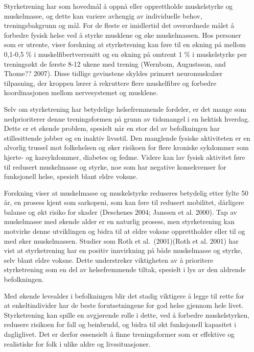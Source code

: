 \documentclass[
  letterpaper,
  DIV=11,
  numbers=noendperiod]{scrreprt}
\begin{document}
Styrketrening har som hovedmål å oppnå eller opprettholde muskelstyrke
og muskelmasse, og dette kan variere avhengig av individuelle behov,
treningsbakgrunn og mål. For de fleste er imidlertid det overordnede
målet å forbedre fysisk helse ved å styrke musklene og øke muskelmassen.
Hos personer som er utrente, viser forskning at styrketrening kan føre
til en økning på mellom 0,1-0,5 \% i muskelfibertverrsnitt og en økning
på omtrent 1 \% i muskelstyrke per treningsøkt de første 8-12 ukene med
trening (Wernbom, Augustsson, and Thome?? 2007). Disse tidlige
gevinstene skyldes primært neuromuskulær tilpasning, der kroppen lærer å
rekruttere flere muskelfibre og forbedre koordinasjonen mellom
nervesystemet og musklene.

Selv om styrketrening har betydelige helsefremmende fordeler, er det
mange som nedprioriterer denne treningsformen på grunn av tidsmangel i
en hektisk hverdag. Dette er et økende problem, spesielt når en stor del
av befolkningen har stillesittende jobber og en inaktiv livsstil. Den
manglende fysiske aktiviteten er en alvorlig trussel mot folkehelsen og
øker risikoen for flere kroniske sykdommer som hjerte- og karsykdommer,
diabetes og fedme. Videre kan lav fysisk aktivitet føre til redusert
muskelmasse og styrke, noe som har negative konsekvenser for funksjonell
helse, spesielt blant eldre voksne.

Forskning viser at muskelmasse og muskelstyrke reduseres betydelig etter
fylte 50 år, en prosess kjent som sarkopeni, som kan føre til redusert
mobilitet, dårligere balanse og økt risiko for skader (Deschenes 2004;
Janssen et al. 2000). Tap av muskelmasse med økende alder er en naturlig
prosess, men styrketrening kan motvirke denne utviklingen og bidra til
at eldre voksne opprettholder eller til og med øker muskelmassen.
Studier som Roth et al.~(2001)(Roth et al. 2001) har vist at
styrketrening har en positiv innvirkning på både muskelmasse og styrke,
selv blant eldre voksne. Dette understreker viktigheten av å prioritere
styrketrening som en del av helsefremmende tiltak, spesielt i lys av den
aldrende befolkningen.

Med økende levealder i befolkningen blir det stadig viktigere å legge
til rette for at enkeltindivider har de beste forutsetningene for god
helse gjennom hele livet. Styrketrening kan spille en avgjørende rolle i
dette, ved å forbedre muskelstyrken, redusere risikoen for fall og
beinbrudd, og bidra til økt funksjonell kapasitet i dagliglivet. Det er
derfor essensielt å finne treningsformer som er effektive og realistiske
for folk i ulike aldre og livssituasjoner.
\end{document}
